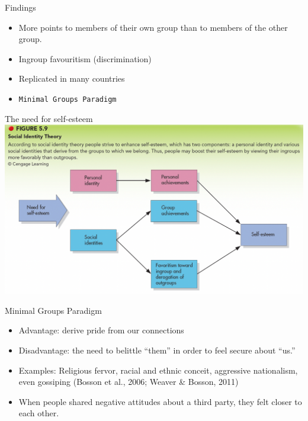 \documentclass[
  ignorenonframetext,
  aspectratio=169,
]{beamer}
\providecommand{\tightlist}{%
  \setlength{\itemsep}{0pt}\setlength{\parskip}{0pt}}\usepackage{longtable,booktabs,array}
\begin{document}
\begin{frame}[fragile]{Findings}
\label{findings}
\begin{itemize}[<+->]
\tightlist
\item
  More points to members of their own group than to members of the other
  group.
\item
  Ingroup favouritism (discrimination)
\item
  Replicated in many countries
\item
  \texttt{Minimal\ Groups\ Paradigm}
\end{itemize}
\end{frame}

\begin{frame}{The need for self-esteem}
\label{the-need-for-self-esteem}
\includegraphics{figs/selfesteem.png}
\end{frame}

\begin{frame}{Minimal Groups Paradigm}
\label{minimal-groups-paradigm}
\begin{itemize}[<+->]
\tightlist
\item
  Advantage: derive pride from our connections
\item
  Disadvantage: the need to belittle ``them'' in order to feel secure
  about ``us.''
\item
  Examples: Religious fervor, racial and ethnic conceit, aggressive
  nationalism, even gossiping (Bosson et al., 2006; Weaver \& Bosson,
  2011)
\item
  When people shared negative attitudes about a third party, they felt
  closer to each other.
\end{itemize}
\end{frame}
\end{document}
